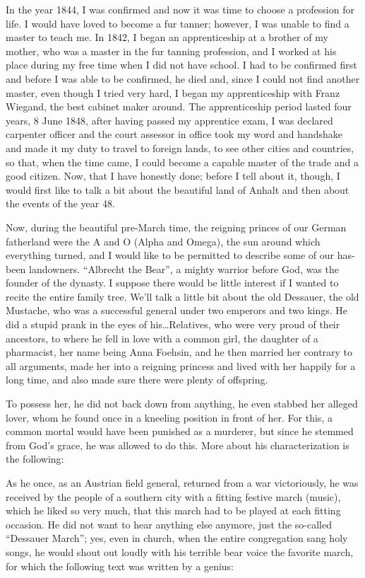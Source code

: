 In the year 1844, I was confirmed and now it was time to choose a profession for life. I would have loved to become a fur tanner; however, I was unable to find a master to teach me. In 1842, I began an apprenticeship at a brother of my mother, who was a master in the fur tanning profession, and I worked at his place during my free time when I did not have school. I had to be confirmed first and before I was able to be confirmed, he died and, since I could not find another master, even though I tried very hard, I began my apprenticeship with Franz Wiegand, the best cabinet maker around. The apprenticeship period lasted four years, 8 June 1848, after having passed my apprentice exam, I was declared carpenter officer and the court assessor in office took my word and handshake and made it my duty to travel to foreign lands, to see other cities and countries, so that, when the time came, I could become a capable master of the trade and a good citizen. Now, that I have honestly done; before I tell about it, though, I would first like to talk a bit about the beautiful land of Anhalt and then about the events of the year 48.

Now, during the beautiful pre-March time, the reigning princes of our German fatherland were the A and O (Alpha and Omega), the sun around which everything turned, and I would like to be permitted to describe some of our has-been landowners. ``Albrecht the Bear'', a mighty warrior before God, was the founder of the dynasty. I suppose there would be little interest if I wanted to recite the entire family tree. We'll talk a little bit about the old Dessauer, the old Mustache, who was a successful general under two emperors and two kings. He did a stupid prank in the eyes of his\ldots Relatives, who were very proud of their ancestors, to where he fell in love with a common girl, the daughter of a pharmacist, her name being Anna Foehsin, and he then married her contrary to all arguments, made her into a reigning princess and lived with her happily for a long time, and also made sure there were plenty of offspring.

To possess her, he did not back down from anything, he even stabbed her alleged lover, whom he found once in a kneeling position in front of her. For this, a common mortal would have been punished as a murderer, but since he stemmed from God's grace, he was allowed to do this. More about his characterization is the following:

As he once, as an Austrian field general, returned from a war victoriously, he was received by the people of a southern city with a fitting festive march (music), which he liked so very much, that this march had to be played at each fitting occasion. He did not want to hear anything else anymore, just the so-called ``Dessauer March''; yes, even in church, when the entire congregation sang holy songs, he would shout out loudly with his terrible bear voice the favorite march, for which the following text was written by a genius:

